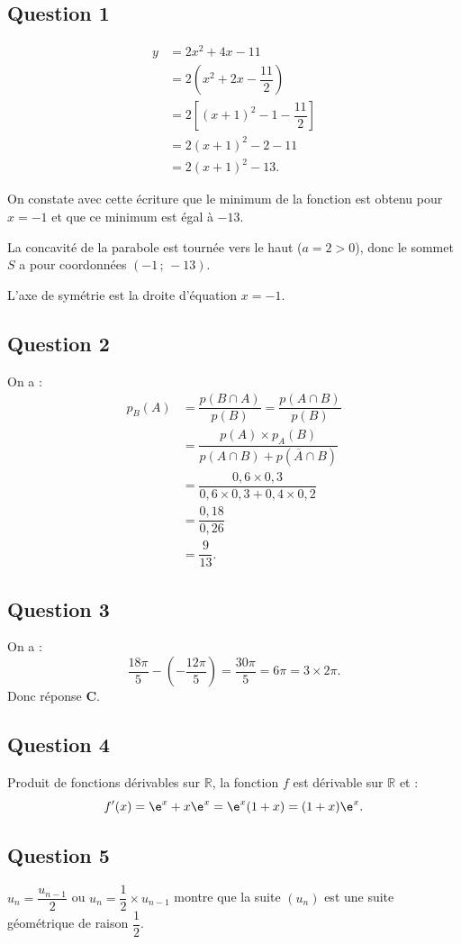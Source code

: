 \subsection*{Question 1}

\begin{align*}
y &= 2x^2 + 4x - 11 \\
&= 2 \left(x^2 + 2x - \dfrac{11}{2}\right) \\
&= 2\left[(x+1)^2 - 1 - \dfrac{11}{2}\right] \\
&= 2(x+1)^2 - 2 - 11 \\
&= 2(x+1)^2 - 13.
\end{align*}

On constate avec cette écriture que le minimum de la fonction est obtenu pour \(x = -1\) et que ce minimum est égal à \(-13\).

La concavité de la parabole est tournée vers le haut (\(a = 2 > 0\)), donc le sommet \(S\) a pour coordonnées \((-1 \,;\, -13)\).

L'axe de symétrie est la droite d'équation \(x = -1\).

\subsection*{Question 2}

On a :
\begin{align*}
p_B(A) &= \dfrac{p(B \cap A)}{p(B)} = \dfrac{p(A \cap B)}{p(B)} \\
&= \dfrac{p(A) \times p_A(B)}{p(A \cap B) + p(\overline{A} \cap B)} \\
&= \dfrac{0{,}6 \times 0{,}3}{0{,}6 \times 0{,}3 + 0{,}4 \times 0{,}2} \\
&= \dfrac{0{,}18}{0{,}26} \\
&= \dfrac{9}{13}.
\end{align*}

\subsection*{Question 3}

On a :
\[
\dfrac{18\pi}{5} - \left(-\dfrac{12\pi}{5}\right) = \dfrac{30\pi}{5} = 6\pi = 3 \times 2\pi.
\]
Donc réponse \(\textbf{C}\).

\subsection*{Question 4}

Produit de fonctions dérivables sur \(\mathbb{R}\), la fonction \(f\) est dérivable sur \(\mathbb{R}\) et :
\[
f'(x) = \e^x + x\e^x = \e^x (1 + x) = (1 + x)\e^x.
\]

\subsection*{Question 5}

\(u_n = \dfrac{u_{n-1}}{2}\) ou \(u_n = \dfrac{1}{2} \times u_{n-1}\) montre que la suite \((u_n)\) est une suite géométrique de raison \(\dfrac{1}{2}\).
